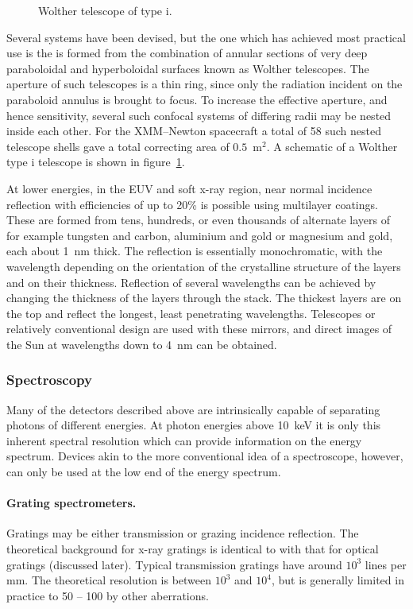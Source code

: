 \documentclass{article}
\begin{document}
\begin{figure}[h]
  \centering  {}
  \caption{Wolther telescope of type {\sc i}.}
  \label{fig:wolther_i}
\end{figure}

Several systems have been devised, but the one which has achieved most practical
use is the is formed from the combination of annular sections of very deep paraboloidal
and hyperboloidal surfaces known as Wolther telescopes. The aperture of such
telescopes is a thin ring, since only the radiation incident on the paraboloid annulus is 
brought to focus. To increase the effective aperture, and hence sensitivity, several
such confocal systems of differing radii may be nested inside each other. For the 
XMM--Newton spacecraft a total of 58 such nested telescope shells gave a total
correcting area of $0.5$~m$^2$. A schematic of a Wolther type {\sc i} telescope is shown
in figure~\ref{fig:wolther_i}.

At lower energies, in the EUV and soft x-ray region, near normal incidence
reflection with efficiencies of up to 20\% is possible using multilayer coatings.
These are formed from tens,  hundreds, or even thousands of alternate layers of 
for example tungsten and carbon, aluminium and gold or magnesium and gold,
each about 1~nm thick. The reflection is essentially monochromatic, with the 
wavelength depending on the orientation of the crystalline structure of the layers and
on their thickness. Reflection of several wavelengths can be achieved by changing 
the thickness of the layers through the stack. The thickest layers are on the top and
reflect the longest, least penetrating wavelengths. Telescopes or relatively 
conventional design are used with these mirrors, and direct images of the Sun 
at wavelengths down to 4~nm can be obtained.

\subsubsection{Spectroscopy}

Many of the detectors described above are intrinsically capable of separating 
photons of different energies. At photon energies above 10~keV it is only this
inherent spectral resolution which can provide information on the energy spectrum.
Devices akin to the more conventional idea of a spectroscope, however, can only 
be used at the low end of the energy spectrum.

\paragraph{Grating spectrometers.} Gratings may be either transmission or grazing
incidence reflection. The theoretical background for x-ray gratings is identical
to with that for optical gratings (discussed later). Typical transmission
gratings have around $10^3$ lines per mm. The theoretical resolution is
between $10^3$ and $10^4$, but is generally limited in practice to 50 -- 100 by
other aberrations.
\end{document}
